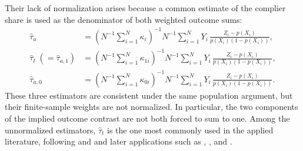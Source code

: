 \documentclass[12pt, a4paper, oneside]{article}
\theoremstyle{plain}
\theoremstyle{definition}
\begin{document}
Their lack of normalization arises because a common estimate of the complier share is used as the denominator of both weighted outcome sums:
\begin{align}
    \hat\tau_a &= \left(N^{-1}\sum_{i=1}^N \kappa_i\right)^{-1} N^{-1}\sum_{i=1}^N Y_i\,\frac{Z_i-p(X_i)}{p(X_i)(1-p(X_i))}, \label{eq:tau_a}\\
    \hat\tau_t \;(=\hat\tau_{a,1}) &= \left(N^{-1}\sum_{i=1}^N \kappa_{1i}\right)^{-1} N^{-1}\sum_{i=1}^N Y_i\,\frac{Z_i-p(X_i)}{p(X_i)(1-p(X_i))}, \label{eq:tau_t}\\
    \hat\tau_{a,0} &= \left(N^{-1}\sum_{i=1}^N \kappa_{0i}\right)^{-1} N^{-1}\sum_{i=1}^N Y_i\,\frac{Z_i-p(X_i)}{p(X_i)(1-p(X_i))}. \label{eq:tau_a0}
\end{align}
These three estimators are consistent under the same population argument, but
their finite-sample weights are not normalized. In particular, the two components
of the implied outcome contrast are not both forced to sum to one. 
Among the unnormalized estimators, $\hat\tau_t$ is the one most commonly used in
the applied literature, following \citet{tan2006regression} and
\citet{frolich2007nonparametric} and later applications such as
\citet{macurdy2011flexible},
\citet{donald2014inverse,donald2014testing}, and
\citet{abdulkadirouglu2017research}.
\end{document}

